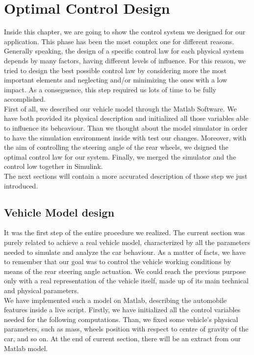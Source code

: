 \chapter{Optimal Control Design}
Inside this chapter, we are going to show the control system we designed for our application. This phase has been the most complex one for different reasons. Generally speaking, the design of a specific control law for each physical system depends by many factors, having different levels of influence. For this reason, we tried to design the best possible control law by considering more the most important elements and neglecting and/or minimizing the ones with a low impact. As a conseguence, this step required us lots of time to be fully accomplished.\\
First of all, we described our vehicle model through the Matlab Software. We have both provided its physical description and initialized all those variables able to influence its behcaviour. Than we thought about the model simulator in order to have the simulation environment inside with test our changes. Moreover, with the aim of controlling the steering angle of the rear wheels, we dsigned the optimal control law for our system. Finally, we merged the simulator and the control low together in Simulink. \\
The next sections will contain a more accurated description of those step we just introduced.
\section{Vehicle Model design}
It was the first step of the entire procedure we realized. The current section was purely related to achieve a real vehicle model, characterized by all the  parameters needed to simulate and analyze the car behaviour. As a matter of facts, we have to remember that our goal was to control the vehicle working conditions by means of the rear steering angle actuation. We could reach the previous purpose only with a real representation of the vehicle itself, made up of its main technical and physical parameters.\\
We have implemented such a model on Matlab, describing the automobile features inside a live script. Firstly, we have initialized all the control variables needed for the following computations. Than, we fixed some vehicle's physical parameters, such as mass, wheels position with respect to centre of gravity of the car, and so on. At the end of current section, there will be an extract from our Matlab model.
\begin{figure} %
	\centering
\end{figure}

